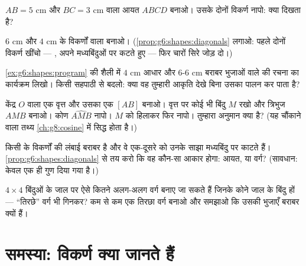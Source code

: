 \begin{exercise}[$\star$]\label{exo:g6:shapes:7}
$AB = 5$ cm और $BC = 3$ cm वाला आयत $ABCD$ बनाओ। उसके दोनों
विकर्ण नापो: क्या दिखता है?
\end{exercise}

\begin{exercise}[$\star$]\label{exo:g6:shapes:8}
$6$ cm और $4$ cm के विकर्णों वाला  बनाओ।
(\cref{prop:g6:shapes:diagonals} लगाओ: पहले दोनों विकर्ण खींचो
--- , अपने मध्यबिंदुओं पर कटते हुए --- फिर चारों सिरे जोड़
दो।)
\end{exercise}

\begin{exercise}[$\star\star$]\label{exo:g6:shapes:9}
\cref{ex:g6:shapes:program} की शैली में $4$ cm आधार और $6$-$6$ cm
बराबर भुजाओं वाले  की रचना का कार्यक्रम लिखो।
किसी सहपाठी से बदलो: क्या वह तुम्हारी आकृति देखे बिना उसका पालन कर पाता है?
\end{exercise}

\begin{exercise}[$\star\star$]\label{exo:g6:shapes:10}
केंद्र $O$ वाला एक वृत्त और उसका एक  $[AB]$ बनाओ। वृत्त पर
कोई भी बिंदु $M$ रखो और त्रिभुज $AMB$ बनाओ। कोण $\widehat{AMB}$
नापो। $M$ को हिलाकर फिर नापो। तुम्हारा अनुमान क्या है?
(यह चौंकाने वाला तथ्य \cref{ch:g8:cosine} में सिद्ध होता है।)
\end{exercise}

\begin{exercise}[$\star\star$]\label{exo:g6:shapes:11}
किसी  के विकर्णों की लंबाई बराबर है और वे एक-दूसरे को
उनके साझा मध्यबिंदु पर काटते हैं। \cref{prop:g6:shapes:diagonals}
से तय करो कि वह कौन-सा आकार होगा: आयत,  या वर्ग?
(सावधान: केवल एक ही गुण दिया गया है।)
\end{exercise}

\begin{exercise}[$\star\star\star$]\label{exo:g6:shapes:12}
$4 \times 4$ बिंदुओं के जाल पर ऐसे कितने अलग-अलग वर्ग बनाए जा
सकते हैं जिनके कोने जाल के बिंदु हों --- ``तिरछे'' वर्ग भी गिनकर?
कम से कम एक तिरछा वर्ग बनाओ और समझाओ कि उसकी भुजाएँ बराबर क्यों हैं।
\end{exercise}

\section{समस्या: विकर्ण क्या जानते हैं}

